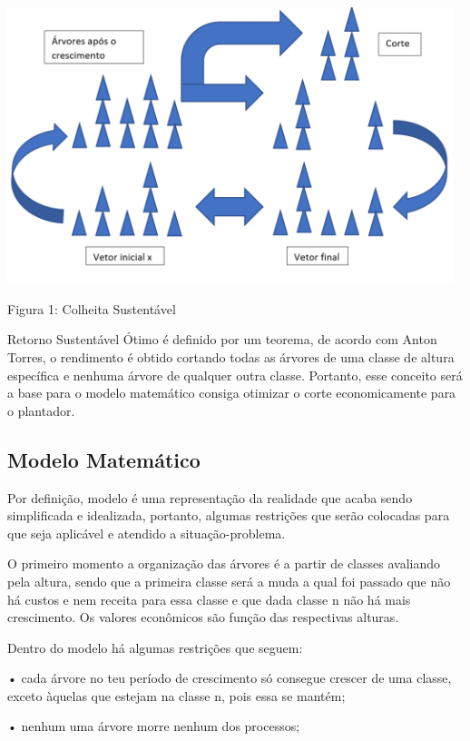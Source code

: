 \documentclass[a4paper, 12pt]{article}
\begin{document}
\begin{center}
    \includegraphics[width=13cm]{colheita-sustentavel.PNG}
    
    Figura 1: Colheita Sustentável
\end{center}

Retorno Sustentável Ótimo é definido por um teorema, de acordo com Anton Torres, o rendimento é obtido cortando todas as árvores de uma classe de altura específica e nenhuma árvore de qualquer outra classe. Portanto, esse conceito será a base para o modelo matemático consiga otimizar o corte economicamente para o plantador.

\subsection{Modelo Matemático}

Por definição, modelo é uma representação da realidade que acaba sendo simplificada e idealizada, portanto, algumas restrições que serão colocadas para que seja aplicável e atendido a situação-problema.

O primeiro momento a organização das árvores é a partir de classes avaliando pela altura, sendo que a primeira classe será a muda a qual foi passado que não há custos e nem receita para essa classe e que dada classe n não há mais crescimento. Os valores econômicos são função das respectivas alturas.

Dentro do modelo há algumas restrições que seguem:

•	cada árvore no teu período de crescimento só consegue crescer de uma classe, exceto àquelas que estejam na classe n, pois essa se mantém;

•	nenhum uma árvore morre nenhum dos processos;
\end{document}
